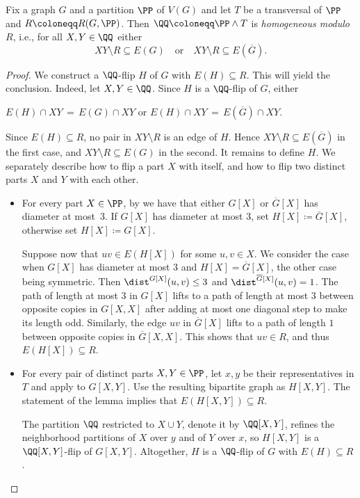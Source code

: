 \begin{lemma}\label{lem:default}
    Fix a graph $G$ and a partition $\PP$ of $V(G)$ and let $T$ be a transversal of $\PP$ and $R \coloneqq R(G,\PP)$.
    Then $\QQ \coloneqq \PP \wedge T$ is \emph{homogeneous modulo $R$}, i.e., for all $X,Y \in \QQ$ either
    \[
        XY \setminus R \subseteq E(G)
        \quad
        \text{or}
        \quad
        XY \setminus R \subseteq E(\overline{G}).
    \]
\end{lemma}

\begin{proof}
    We construct a $\QQ$-flip $H$ of $G$ with $E(H)\subseteq R$. This will yield the conclusion.
    Indeed, let $X,Y\in\QQ$. Since $H$ is a $\QQ$-flip of $G$, either
    \begin{center}
    $E(H)\cap XY \,=\, E(G)\cap XY$ \quad or \quad  $E(H)\cap XY \,=\, E(\overline G)\cap XY$.
    \end{center}
    Since $E(H)\subseteq R$, no pair in $XY\setminus R$ is an edge of $H$.
    Hence $XY\setminus R\subseteq E(\overline G)$ in the first case, and
    $XY\setminus R\subseteq E(G)$ in the second.
    It remains to define $H$. We separately describe how to flip a part $X$ with itself, and how to flip two distinct parts $X$ and $Y$ with each other.

    \begin{itemize}
        \item     For every part $X\in\PP$, by  we have that
    either $G[X]$ or $\overline{G}[X]$ has diameter at most~$3$.
    If $G[X]$ has diameter at most $3$, set
 $H[X]\coloneqq \overline G[X]$, otherwise set $H[X]\coloneqq G[X]$.

 Suppose now that $uv\in E(H[X])$ for some $u,v\in X$.
 We consider the case when $G[X]$ has diameter at most $3$ and
  $H[X] = \overline G[X]$, the other case being symmetric.
Then $\dist^{G[X]}(u,v)\le 3$ and $\dist^{\overline G[X]}(u,v)= 1$.
The path of length at most $3$ in $G[X]$ lifts to a path of length at most $3$ between opposite copies in $G[X,X]$ after adding at most one diagonal step to make its length odd.
Similarly, the edge $uv$ in $\overline G[X]$ lifts to a path of length $1$ between opposite copies in $\overline G[X,X]$. This shows that $uv\in R$, and thus $E(H[X])\subseteq R$.

\item
For every pair of distinct parts $X,Y\in\PP$, let $x,y$ be their representatives in $T$ and apply  to $G[X,Y]$.
    Use the resulting bipartite graph as $H[X,Y]$. The statement of the lemma implies that $E(H[X,Y])\subseteq R$.

    The partition $\QQ$ restricted to $X\cup Y$, denote it by $\QQ[X,Y]$, refines the neighborhood partitions of $X$ over $y$ and of $Y$ over $x$, so $H[X,Y]$ is a $\QQ[X,Y]$-flip of $G[X,Y]$.
    Altogether, $H$ is a
    $\QQ$-flip of $G$ with $E(H)\subseteq R$.\qedhere
    \end{itemize}
\end{proof}

